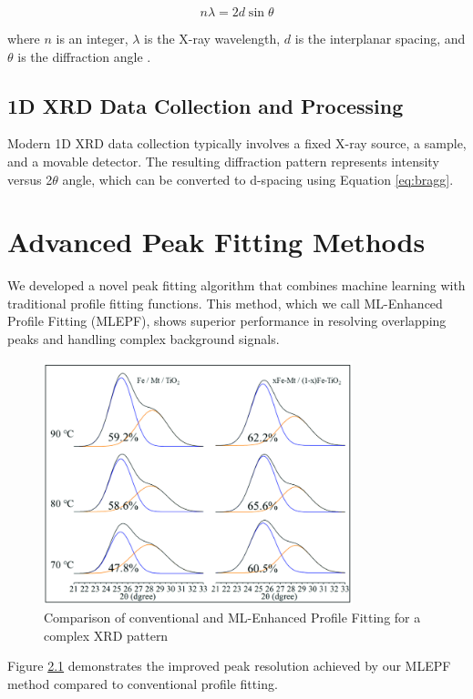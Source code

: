 \documentclass{DMSE-Thesis}
\begin{document}
\begin{equation}
n\lambda = 2d\sin\theta
\label{eq:bragg}
\end{equation}

where $n$ is an integer, $\lambda$ is the X-ray wavelength, $d$ is the interplanar spacing, and $\theta$ is the diffraction angle \cite{warren1969x}.

\section{1D XRD Data Collection and Processing}
Modern 1D XRD data collection typically involves a fixed X-ray source, a sample, and a movable detector. The resulting diffraction pattern represents intensity versus 2$\theta$ angle, which can be converted to d-spacing using Equation \ref{eq:bragg}.

\chapter{Advanced Peak Fitting Methods}
We developed a novel peak fitting algorithm that combines machine learning with traditional profile fitting functions. This method, which we call ML-Enhanced Profile Fitting (MLEPF), shows superior performance in resolving overlapping peaks and handling complex background signals.

\begin{figure}[H]
\centering
\includegraphics[width=0.8\textwidth]{xrd_peak_fitting.png}
\caption{Comparison of conventional and ML-Enhanced Profile Fitting for a complex XRD pattern}
\label{fig:peak_fitting}
\end{figure}

Figure \ref{fig:peak_fitting} demonstrates the improved peak resolution achieved by our MLEPF method compared to conventional profile fitting.
\end{document}
